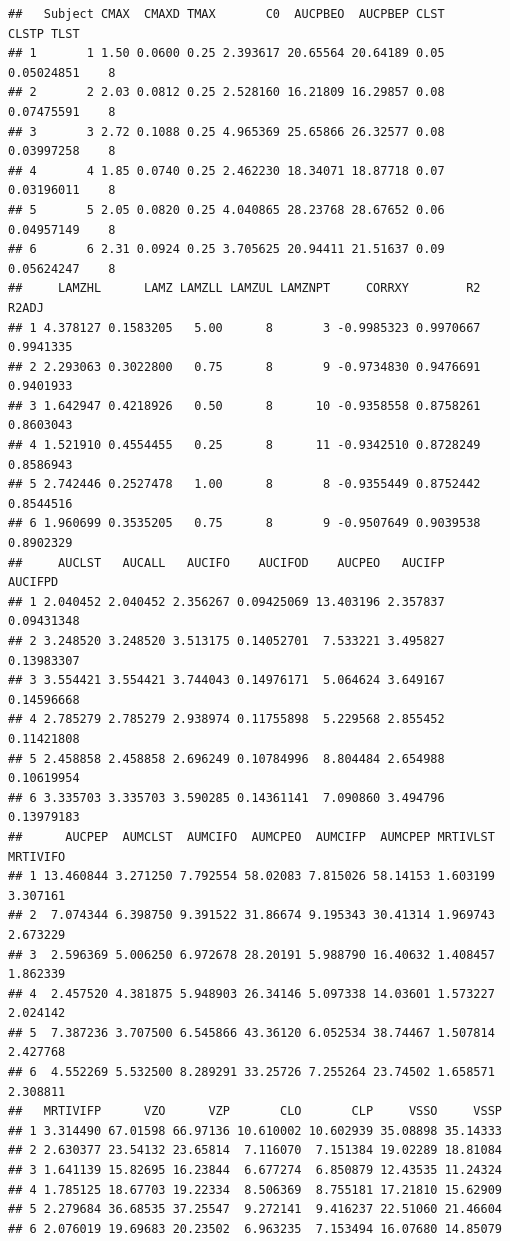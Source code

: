 \documentclass[]{krantz}
\theoremstyle{definition}
\theoremstyle{definition}
\theoremstyle{definition}
\theoremstyle{remark}
\begin{document}
\begin{verbatim}
##   Subject CMAX  CMAXD TMAX       C0  AUCPBEO  AUCPBEP CLST      CLSTP TLST
## 1       1 1.50 0.0600 0.25 2.393617 20.65564 20.64189 0.05 0.05024851    8
## 2       2 2.03 0.0812 0.25 2.528160 16.21809 16.29857 0.08 0.07475591    8
## 3       3 2.72 0.1088 0.25 4.965369 25.65866 26.32577 0.08 0.03997258    8
## 4       4 1.85 0.0740 0.25 2.462230 18.34071 18.87718 0.07 0.03196011    8
## 5       5 2.05 0.0820 0.25 4.040865 28.23768 28.67652 0.06 0.04957149    8
## 6       6 2.31 0.0924 0.25 3.705625 20.94411 21.51637 0.09 0.05624247    8
##     LAMZHL      LAMZ LAMZLL LAMZUL LAMZNPT     CORRXY        R2     R2ADJ
## 1 4.378127 0.1583205   5.00      8       3 -0.9985323 0.9970667 0.9941335
## 2 2.293063 0.3022800   0.75      8       9 -0.9734830 0.9476691 0.9401933
## 3 1.642947 0.4218926   0.50      8      10 -0.9358558 0.8758261 0.8603043
## 4 1.521910 0.4554455   0.25      8      11 -0.9342510 0.8728249 0.8586943
## 5 2.742446 0.2527478   1.00      8       8 -0.9355449 0.8752442 0.8544516
## 6 1.960699 0.3535205   0.75      8       9 -0.9507649 0.9039538 0.8902329
##     AUCLST   AUCALL   AUCIFO    AUCIFOD    AUCPEO   AUCIFP    AUCIFPD
## 1 2.040452 2.040452 2.356267 0.09425069 13.403196 2.357837 0.09431348
## 2 3.248520 3.248520 3.513175 0.14052701  7.533221 3.495827 0.13983307
## 3 3.554421 3.554421 3.744043 0.14976171  5.064624 3.649167 0.14596668
## 4 2.785279 2.785279 2.938974 0.11755898  5.229568 2.855452 0.11421808
## 5 2.458858 2.458858 2.696249 0.10784996  8.804484 2.654988 0.10619954
## 6 3.335703 3.335703 3.590285 0.14361141  7.090860 3.494796 0.13979183
##      AUCPEP  AUMCLST  AUMCIFO  AUMCPEO  AUMCIFP  AUMCPEP MRTIVLST MRTIVIFO
## 1 13.460844 3.271250 7.792554 58.02083 7.815026 58.14153 1.603199 3.307161
## 2  7.074344 6.398750 9.391522 31.86674 9.195343 30.41314 1.969743 2.673229
## 3  2.596369 5.006250 6.972678 28.20191 5.988790 16.40632 1.408457 1.862339
## 4  2.457520 4.381875 5.948903 26.34146 5.097338 14.03601 1.573227 2.024142
## 5  7.387236 3.707500 6.545866 43.36120 6.052534 38.74467 1.507814 2.427768
## 6  4.552269 5.532500 8.289291 33.25726 7.255264 23.74502 1.658571 2.308811
##   MRTIVIFP      VZO      VZP       CLO       CLP     VSSO     VSSP
## 1 3.314490 67.01598 66.97136 10.610002 10.602939 35.08898 35.14333
## 2 2.630377 23.54132 23.65814  7.116070  7.151384 19.02289 18.81084
## 3 1.641139 15.82695 16.23844  6.677274  6.850879 12.43535 11.24324
## 4 1.785125 18.67703 19.22334  8.506369  8.755181 17.21810 15.62909
## 5 2.279684 36.68535 37.25547  9.272141  9.416237 22.51060 21.46604
## 6 2.076019 19.69683 20.23502  6.963235  7.153494 16.07680 14.85079
\end{verbatim}
\end{document}
